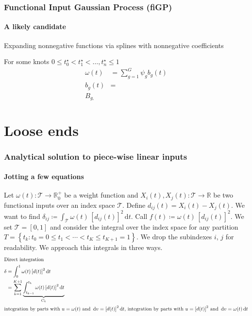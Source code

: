 \documentclass{snedecorbeamer}
\begin{document}
\begin{frame}
  \frametitle{Functional Input Gaussian Process (fiGP)}
  \framesubtitle{A likely candidate}

  Expanding nonnegative functions via splines with nonnegative coefficients

  For some knots $0 \le t^\star_0 < t^\star_1 < \dots, t^\star_n \le 1$
  \begin{align}
    \omega(t)
    &=\sum_{g=1}^{G}\psi_{g}b_g(t) \\
    b_g(t)
    &= \\
    B_{g,}
  \end{align}
\end{frame}

\section{Loose ends}

\begin{frame}
  \frametitle{Analytical solution to piece-wise linear inputs}
  \framesubtitle{Jotting a few equations}

  \newcommand{\calT}{\mathcal{T}}
  \newcommand{\dt}{\, \mathrm{d}t}
  \newcommand{\du}{\, \mathrm{d}u}
  \newcommand{\dv}{\, \mathrm{d}v}
  \newcommand{\w}{\omega}
  \newcommand{\dotsq}{{\left[d(t)\right]}^2}
  \newcommand{\fall}{\,~\forall~\,}

  Let $\w(t): \calT \to \mathbb{R}_0^+$ be a weight function and
  $X_i(t), X_j(t): \calT \to \mathbb{R}$ be two functional inputs over
  an index space $\calT$.  Define $d_{ij}(t) = X_i(t) - X_j(t)$.  We
  want to find $ \delta_{ij} \coloneqq \int_{\calT} \w(t) \,
  {\left[d_{ij}(t)\right]}^2 \dt$. Call $f(t) \coloneqq \w(t) \,
  {\left[d_{ij}(t)\right]}^2$.  We set $\calT = [0, 1]$ and consider the
  integral over the index space for any partition $T = \left\{ t_k: t_0
    = 0 \le t_1 < \cdots < t_K \le t_{K+1} = 1 \right\}$.  We drop the
  subindexes $i$, $j$ for readability. We approach this integrals in
  three ways.
  \begin{align}
  \intertext{Direct integration}
  \delta
  &=\int_0^1 \w(t) \, \dotsq \dt \label{eq:fnorm-direct} \\
  &=\sum_{k = 1}^{K + 1}
    \underbrace{
    \int_{t_{k-1}}^{t_k} \w(t) \, \dotsq
    \dt}_{C_k} \label{eq:fnorm-direct-pw} \\
    \intertext{integration by parts with $u = \w(t)$ and
    $\dv = \dotsq\dt$, integration by parts with $u = \dotsq$ and $\dv =
    \w(t)\dt$}\nonumber
  \end{align}
\end{frame}
\end{document}
